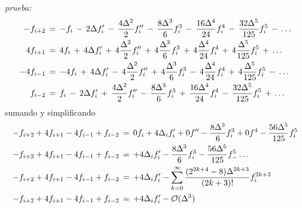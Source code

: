 \documentclass[9pt,technote,twoside,letterpaper,onecolumn]{IEEEtran}
\begin{document}
\begin{multicols}{2}
\emph{prueba:}
{\tiny
  \begin{align}
    -f_{i+2}&\,=\,-f_i
              \,-\,2\Delta f'_i
              \,-\,\frac{4\Delta^2}{2}f''_i
              \,-\,\frac{8\Delta^3}{6}f^3_i
              \,-\,\frac{16\Delta^4}{24}f^4_i
              \,-\,\frac{32\Delta^5}{125}f^5_i  
              \,-\,\ldots  
              \notag\\
    4f_{i+1}&\,=\,4f_i
              \,+\,4\Delta f'_i
              \,+\,4\frac{\Delta^2}{2}f''_i
              \,+\,4\frac{\Delta^3}{6}f^3_i
              \,+\,4\frac{\Delta^4}{24}f^4_i
              \,+\,4\frac{\Delta^5}{125}f^5_i  
              \,+\,\ldots  
              \notag\\
    -4f_{i-1}&\,=\,-4f_i
               \,+\,4\Delta f'_i
               \,-\,4\frac{\Delta^2}{2}f''_i
               \,+\,4\frac{\Delta^3}{6}f^3_i
               \,-\,4\frac{\Delta^4}{24}f^4_i
               \,+\,4\frac{\Delta^5}{125}f^5_i  
               \,-\,\ldots  
               \notag\\
    f_{i-2}&\,=\,f_i
             \,-\,2\Delta f'_i
             \,+\,\frac{4\Delta^2}{2}f''_i
             \,-\,\frac{8\Delta^3}{6}f^3_i
             \,+\,\frac{16\Delta^4}{24}f^4_i
             \,-\,\frac{32\Delta^5}{125}f^5_i  
             \,+\,\ldots
             \notag
  \end{align}
}
sumando y simplificando 
{\tiny
  \begin{align}
    -f_{i+2}+4f_{i+1}-4f_{i-1}+f_{i-2}\,&=\,0f_i
                                          +4\Delta_if'_i
                                          +0f''
                                          -\frac{8\Delta^3}{6}f^3_i
                                          +0f^4
                                          -\frac{56\Delta^5}{125}f^5_i\notag\\
    -f_{i+2}+4f_{i+1}-4f_{i-1}+f_{i-2}\,&=\,+4\Delta_if'_i
                                          -\frac{8\Delta^3}{6}f^3_i
                                          -\frac{56\Delta^5}{125}f^5_
                                          -\ldots\notag\\
    -f_{i+2}+4f_{i+1}-4f_{i-1}+f_{i-2}\,&=\,+4\Delta_if'_i
                                          -\sum^\infty_{k=0}\frac{(2^{2k+4}-8)\Delta^{2k+3}}{(2k+3)!}f^{2k+3}_i\notag\\
    -f_{i+2}+4f_{i+1}-4f_{i-1}+f_{i-2}\,&=\,+4\Delta_if'_i
                                          -\mathcal{O}(\Delta^3)
  \end{align}
}


\end{multicols}
\end{document}
